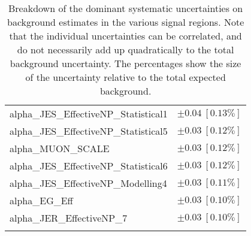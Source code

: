 \begin{table}
\begin{center}
\begin{tabular*}{\textwidth}{@{\extracolsep{\fill}}lc}
alpha\_JES\_EffectiveNP\_Statistical1         & $\pm 0.04\ [0.13\%] $       \\
alpha\_JES\_EffectiveNP\_Statistical5         & $\pm 0.03\ [0.12\%] $       \\
alpha\_MUON\_SCALE         & $\pm 0.03\ [0.12\%] $       \\
alpha\_JES\_EffectiveNP\_Statistical6         & $\pm 0.03\ [0.12\%] $       \\
alpha\_JES\_EffectiveNP\_Modelling4         & $\pm 0.03\ [0.11\%] $       \\
alpha\_EG\_Eff         & $\pm 0.03\ [0.10\%] $       \\
alpha\_JER\_EffectiveNP\_7         & $\pm 0.03\ [0.10\%] $       \\
\noalign{\smallskip}\hline\noalign{\smallskip}
\end{tabular*}
\end{center}
\caption[Breakdown of uncertainty on background estimates]{
Breakdown of the dominant systematic uncertainties on background estimates in the various signal regions.
Note that the individual uncertainties can be correlated, and do not necessarily add up quadratically to 
the total background uncertainty. The percentages show the size of the uncertainty relative to the total expected background.
\label{table.results.bkgestimate.uncertainties.SRLMEM_mct2}}
\end{table}
%